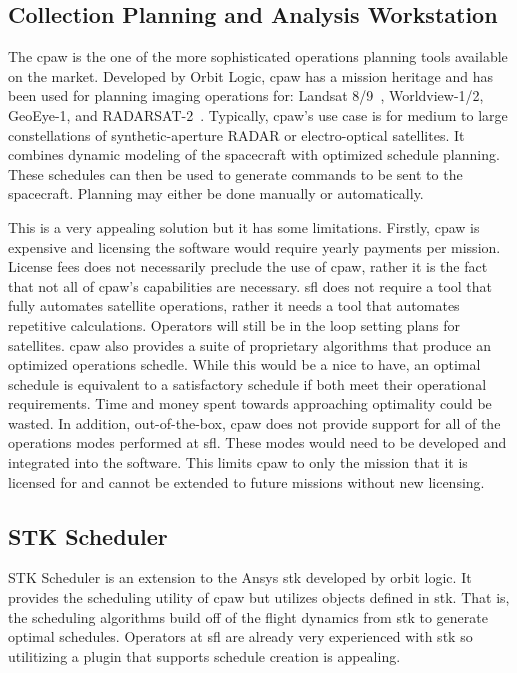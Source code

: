 \subsection{Collection Planning and Analysis Workstation}

The \acrfull{cpaw} is the one of the more sophisticated operations planning
tools available on the market.  Developed by Orbit Logic, \gls{cpaw} has a
mission heritage and has been used for planning imaging operations for: Landsat
8/9~\cite{gokhale_mission_nodate}, Worldview-1/2, GeoEye-1, and
RADARSAT-2~\cite{herz_eo_2014}. Typically, \gls{cpaw}'s use case is for medium
to large constellations of synthetic-aperture RADAR or electro-optical
satellites. It combines dynamic modeling of the spacecraft with optimized
schedule planning. These schedules can then be used to generate commands to be
sent to the spacecraft. Planning may either be done manually or automatically. 

This is a very appealing solution but it has some limitations. Firstly,
\gls{cpaw} is expensive and licensing the software would require yearly
payments per mission. License fees does not necessarily preclude the use of
\gls{cpaw}, rather it is the fact that not all of \gls{cpaw}'s capabilities are
necessary.  \gls{sfl} does not require a tool that fully automates satellite
operations, rather it needs a tool that automates repetitive calculations.
Operators will still be in the loop setting plans for satellites. \gls{cpaw}
also provides a suite of proprietary algorithms that produce an optimized
operations schedle.  While this would be a nice to have, an optimal schedule is
equivalent to a satisfactory schedule if both meet their operational
requirements. Time and money spent towards approaching optimality could be
wasted. In addition, out-of-the-box, \gls{cpaw} does not provide support for
all of the operations modes performed at \gls{sfl}. These modes would need to
be developed and integrated into the software. This limits \gls{cpaw} to only
the mission that it is licensed for and cannot be extended to future missions
without new licensing.


\subsection{STK Scheduler} 

STK Scheduler is an extension to the Ansys \acrlong{stk} developed by orbit
logic. It provides the scheduling utility of \gls{cpaw} but utilizes objects
defined in \gls{stk}. That is, the scheduling algorithms build off of the
flight dynamics from \gls{stk} to generate optimal schedules. Operators at
\gls{sfl} are already very experienced with \gls{stk} so utilitizing a plugin
that supports schedule creation is appealing.

